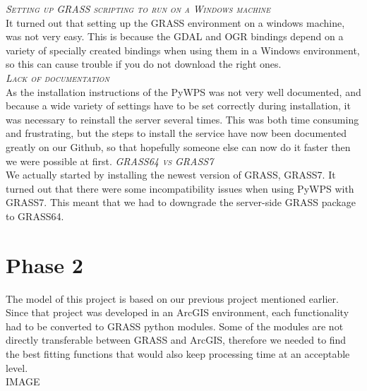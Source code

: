 \textsc{\textit{Setting up GRASS scripting to run on a Windows machine}}\\

It turned out that setting up the GRASS environment on a windows machine, was not very easy. This is because the GDAL and OGR bindings depend on a variety of specially created bindings when using them in a Windows environment, so this can cause trouble if you do not download the right ones.\\

\textsc{\textit{Lack of documentation}}\\

As the installation instructions of the PyWPS was not very well documented, and because a wide variety of settings have to be set correctly during installation, it was necessary to reinstall the server several times. This was both time consuming and frustrating, but the steps to install the service have now been documented greatly on our Github, so that hopefully someone else can now do it faster then we were possible at first. 
\textsc{\textit{GRASS64 vs GRASS7}}\\

We actually started by installing the newest version of GRASS, GRASS7. It turned out that there were some  incompatibility issues when using PyWPS with GRASS7. This meant that we had to downgrade the server-side GRASS package to GRASS64.\\

\section{Phase 2}
The model of this project is based on our previous project mentioned earlier. Since that project was developed in an ArcGIS environment, each functionality had to be converted to GRASS python modules. Some of the modules are not directly transferable between GRASS and ArcGIS, therefore we needed to find the best fitting functions that would also keep processing time at an acceptable level.\\

IMAGE\\
\\

